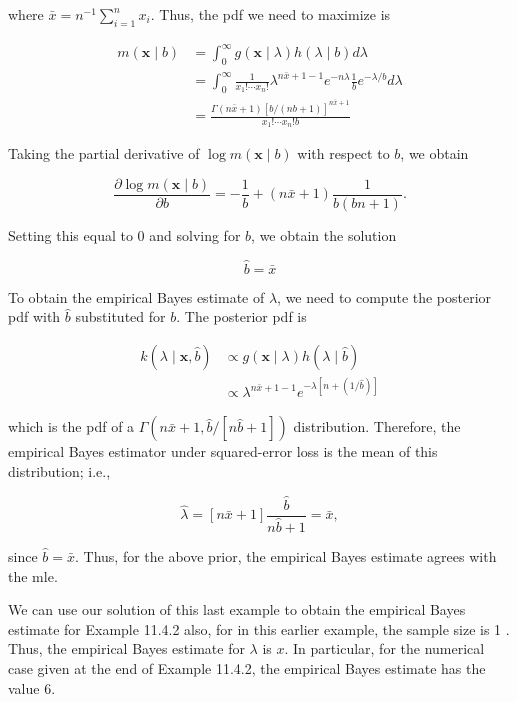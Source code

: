 where $\bar{x}=n^{-1} \sum_{i=1}^{n} x_{i}$. Thus, the pdf we need to maximize is

$$
\begin{aligned}
m(\mathbf{x} \mid b) & =\int_{0}^{\infty} g(\mathbf{x} \mid \lambda) h(\lambda \mid b) d \lambda \\
& =\int_{0}^{\infty} \frac{1}{x_{1}!\cdots x_{n}!} \lambda^{n \bar{x}+1-1} e^{-n \lambda} \frac{1}{b} e^{-\lambda / b} d \lambda \\
& =\frac{\Gamma(n \bar{x}+1)[b /(n b+1)]^{n \bar{x}+1}}{x_{1}!\cdots x_{n}!b}
\end{aligned}
$$

Taking the partial derivative of $\log m(\mathbf{x} \mid b)$ with respect to $b$, we obtain

$$
\frac{\partial \log m(\mathbf{x} \mid b)}{\partial b}=-\frac{1}{b}+(n \bar{x}+1) \frac{1}{b(b n+1)} .
$$

Setting this equal to 0 and solving for $b$, we obtain the solution


\begin{equation*}
\widehat{b}=\bar{x} \tag{11.4.14}
\end{equation*}


To obtain the empirical Bayes estimate of $\lambda$, we need to compute the posterior pdf with $\widehat{b}$ substituted for $b$. The posterior pdf is


\begin{align*}
k(\lambda \mid \mathbf{x}, \widehat{b}) & \propto g(\mathbf{x} \mid \lambda) h(\lambda \mid \widehat{b}) \\
& \propto \lambda^{n \bar{x}+1-1} e^{-\lambda[n+(1 / \widehat{b})]} \tag{11.4.15}
\end{align*}


which is the pdf of a $\Gamma(n \bar{x}+1, \widehat{b} /[n \widehat{b}+1])$ distribution. Therefore, the empirical Bayes estimator under squared-error loss is the mean of this distribution; i.e.,


\begin{equation*}
\widehat{\lambda}=[n \bar{x}+1] \frac{\widehat{b}}{n \widehat{b}+1}=\bar{x}, \tag{11.4.16}
\end{equation*}


since $\widehat{b}=\bar{x}$. Thus, for the above prior, the empirical Bayes estimate agrees with the mle.

We can use our solution of this last example to obtain the empirical Bayes estimate for Example 11.4.2 also, for in this earlier example, the sample size is 1 . Thus, the empirical Bayes estimate for $\lambda$ is $x$. In particular, for the numerical case given at the end of Example 11.4.2, the empirical Bayes estimate has the value 6.

